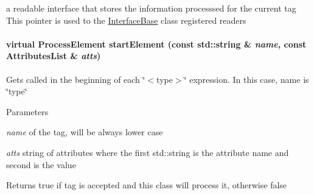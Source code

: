\label{classOpenRAVE_1_1BaseXMLReader_a96a8303765bddf9742cbc422f8a9c2d6}
a readable interface that stores the information processsed for the current tag This pointer is used to the \hyperlink{classOpenRAVE_1_1InterfaceBase}{InterfaceBase} class registered readers \hypertarget{classOpenRAVE_1_1BaseXMLReader_a96b3e3b4503108964001ad58ab724ac3}{
\paragraph[{startElement}]{\setlength{\rightskip}{0pt plus 5cm}virtual {\bf ProcessElement} startElement (const std::string \& {\em name}, \/  const AttributesList \& {\em atts})}\hfill}
\label{classOpenRAVE_1_1BaseXMLReader_a96b3e3b4503108964001ad58ab724ac3}
Gets called in the beginning of each \char`\"{}$<$type$>$\char`\"{} expression. In this case, name is \char`\"{}type\char`\"{} 
\begin{DoxyParams}{Parameters}
\item[{\em name}]of the tag, will be always lower case \item[{\em atts}]string of attributes where the first std::string is the attribute name and second is the value \end{DoxyParams}
\begin{DoxyReturn}{Returns}
true if tag is accepted and this class will process it, otherwise false 
\end{DoxyReturn}
